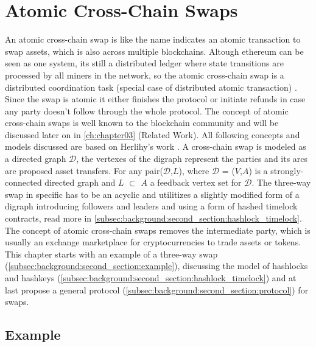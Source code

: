 \section{Atomic Cross-Chain Swaps}
\label{sec:background:fifth_section}
An atomic cross-chain swap is like the name indicates an atomic transaction to swap assets, which is also across multiple blockchains. Altough ethereum can be seen as one system, its still a distributed ledger where state transitions are processed by all miners in the network, so the atomic cross-chain swap is a distributed coordination task (special case of distributed atomic transaction) \cite{weikum2001transactional}. Since the swap is atomic it either finishes the protocol or initiate refunds in case any party doesn't follow through the whole protocol. The concept of atomic cross-chain swaps is well known to the blockchain community and will be discussed later on in \autoref{ch:chapter03} (Related Work). All following concepts and models discussed are based on Herlihy's work \cite{herlihy2018atomic}. A cross-chain swap is modeled as a directed graph $\mathcal{D}$, the vertexes of the digraph represent the parties and its arcs are proposed asset transfers. For any pair($\mathcal{D}$,$L$), where $\mathcal{D}$ = ($V$,$A$) is a strongly-connected directed graph and $L$ $\subset$ $A$ a feedback vertex set for $\mathcal{D}$. The three-way swap in specific has to be an acyclic and utilitizes a slightly modified form of a digraph introducing followers and leaders and using a form of hashed timelock contracts, read more in \autoref{subsec:background:second_section:hashlock_timelock}. The concept of atomic cross-chain swaps removes the intermediate party, which is usually an exchange marketplace for cryptocurrencies to trade assets or tokens. This chapter starts with an example of a three-way swap (\autoref{subsec:background:second_section:example}), discussing the model of hashlocks and hashkeys (\autoref{subsec:background:second_section:hashlock_timelock}) and at last propose a general protocol (\autoref{subsec:background:second_section:protocol}) for swaps.



\subsection{Example}
\label{subsec:background:second_section:example}

